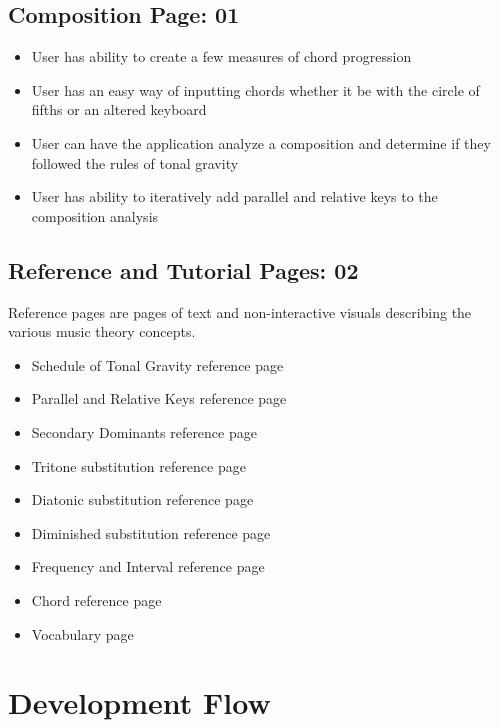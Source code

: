 \documentclass[onecolumn, draftclsnofoot,10pt, compsoc]{IEEEtran}
\begin{document}
\subsection{Composition Page: 01}
\begin{itemize}
\item User has ability to create a few measures of chord progression
\item User has an easy way of inputting chords whether it be with the circle of fifths or an altered keyboard
\item User can have the application analyze a composition and determine if they followed the rules of tonal gravity
\item User has ability to iteratively add parallel and relative keys to the composition analysis
\end{itemize}

\pagebreak
\subsection{Reference and Tutorial Pages: 02}
Reference pages are pages of text and non-interactive visuals describing the various music theory concepts.
\begin{itemize}
\item Schedule of Tonal Gravity reference page
\item Parallel and Relative Keys reference page
\item Secondary Dominants reference page
\item Tritone substitution reference page
\item Diatonic substitution reference page
\item Diminished substitution reference page
\item Frequency and Interval reference page 
\item Chord reference page
\item Vocabulary page
\end{itemize}

\section{Development Flow}
\begin{ganttchart}{1}{15}
     \\

     \\
     \\
     \\

     \\
     \\
     \\

\end{ganttchart}
\end{document}
